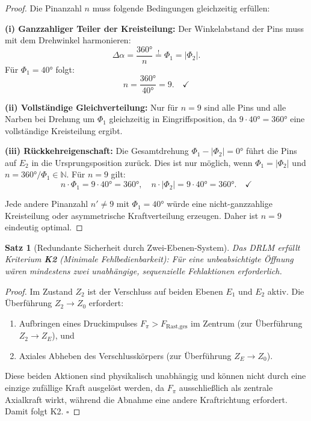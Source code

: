 ﻿\documentclass[12pt, a4paper]{article}
\newtheorem{theorem}{Satz}[section]
\theoremstyle{remark}
\begin{document}
\begin{proof}
  Die Pinanzahl $n$ muss folgende Bedingungen gleichzeitig erfüllen:

  \textbf{(i) Ganzzahliger Teiler der Kreisteilung:}
  Der Winkelabstand der Pins muss mit dem Drehwinkel harmonieren:
  \[
    \Delta\alpha = \frac{360 °}{n} \overset{!}{=} \Phi_1 = |\Phi_2|.
  \]
  Für $\Phi_1 = 40 °$ folgt:
  \[
    n = \frac{360 °}{40 °} = 9. \quad \checkmark
  \]

  \textbf{(ii) Vollständige Gleichverteilung:}
  Nur für $n = 9$ sind alle Pins und alle Narben bei Drehung um $\Phi_1$ gleichzeitig in
  Eingriffsposition, da $9 \cdot 40 ° = 360 °$ eine vollständige Kreisteilung ergibt.

  \textbf{(iii) Rückkehreigenschaft:}
  Die Gesamtdrehung $\Phi_1 - |\Phi_2| = 0 °$ führt die Pins auf $E_2$ in die
  Ursprungsposition zurück. Dies ist nur möglich, wenn $\Phi_1 = |\Phi_2|$ und
  $n = 360 °/\Phi_1 \in \mathbb{N}$. Für $n=9$ gilt:
  \[
    n \cdot \Phi_1 = 9 \cdot 40 ° = 360 °, \quad n \cdot |\Phi_2| = 9 \cdot 40 ° = 360 °. \quad \checkmark
  \]

  Jede andere Pinanzahl $n' \neq 9$ mit $\Phi_1 = 40 °$ würde eine nicht-ganzzahlige
  Kreisteilung oder asymmetrische Kraftverteilung erzeugen. Daher ist $n = 9$ eindeutig optimal.
\end{proof}

\begin{theorem}[Redundante Sicherheit durch Zwei-Ebenen-System]
  \label{thm:redundanz}
  Das DRLM erfüllt Kriterium \textbf{K2} (Minimale Fehlbedienbarkeit): Für eine
  unbeabsichtigte Öffnung wären mindestens zwei unabhängige, sequenzielle Fehlaktionen
  erforderlich.
\end{theorem}

\begin{proof}
  Im Zustand $Z_2$ ist der Verschluss auf beiden Ebenen $E_1$ und $E_2$ aktiv. Die
  Überführung $Z_2 \to Z_0$ erfordert:
  \begin{enumerate}
    \item Aufbringen eines Druckimpulses $F_\pi > F_{\text{Rast,ges}}$ im Zentrum
          (zur Überführung $Z_2 \to Z_E$), und
    \item Axiales Abheben des Verschlusskörpers (zur Überführung $Z_E \to Z_0$).
  \end{enumerate}
  Diese beiden Aktionen sind physikalisch unabhängig und können nicht durch eine einzige
  zufällige Kraft ausgelöst werden, da $F_\pi$ ausschließlich als zentrale Axialkraft wirkt,
  während die Abnahme eine andere Kraft\-richtung erfordert. Damit folgt K2. $\square$
\end{proof}
\end{document}
